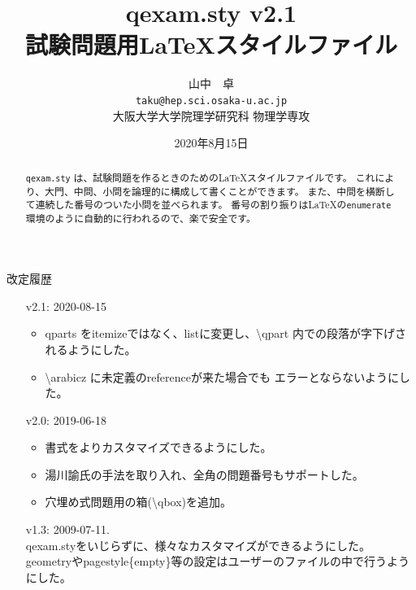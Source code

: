 \documentclass[dvipdfmx,a4j,11pt]{jarticle}
\title{{\bf qexam.sty} v2.1\\
試験問題用\LaTeX スタイルファイル}
\author{山中　卓\\
{\tt taku@hep.sci.osaka-u.ac.jp}\\
大阪大学大学院理学研究科 物理学専攻}
\date{2020年8月15日}                                           %
\begin{document}
\maketitle
\begin{abstract}
	\texttt{qexam.sty} は、試験問題を作るときのための\LaTeX スタイルファイルです。
	これにより、大門、中問、小問を論理的に構成して書くことができます。
	また、中問を横断して連続した番号のついた小問を並べられます。
	番号の割り振りは\LaTeX の{\tt enumerate}環境のように自動的に行われるので、楽で安全です。
\end{abstract}

改定履歴
\begin{itemize}
	\item [v2.1:] 2020-08-15
		\begin{itemize}
			\item qparts をitemizeではなく、listに変更し、\textbackslash qpart
				内での段落が字下げされるようにした。
			\item \textbackslash arabicz に未定義のreferenceが来た場合でも
				エラーとならないようにした。
		\end{itemize}
		
	\item [v2.0:] 2019-06-18
		\begin{itemize}
			\item 書式をよりカスタマイズできるようにした。
			\item 湯川諭氏の手法を取り入れ、全角の問題番号もサポートした。
			\item 穴埋め式問題用の箱(\textbackslash qbox)を追加。
		\end{itemize}
	\item[v1.3:] 2009-07-11.\\
			 qexam.styをいじらずに、様々なカスタマイズができるようにした。\\
			 geometryやpagestyle\{empty\}等の設定はユーザーのファイルの中で行うようにした。
\end{itemize}

\clearpage
\tableofcontents
\clearpage
\end{document}
